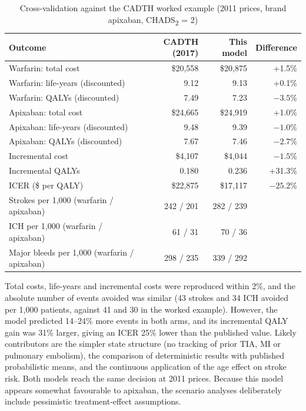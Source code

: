 \documentclass[11pt,letterpaper]{article}
\begin{document}
\begin{table}[H]
\centering
\caption{Cross-validation against the CADTH worked example (2011 prices, brand apixaban,
CHADS\textsubscript{2} = 2)}
\label{tab:validation}
\small
\begin{tabular}{@{}lrrr@{}}
\toprule
Outcome & CADTH (2017) & This model & Difference \\
\midrule
Warfarin: total cost & \$20,558 & \$20,875 & +1.5\% \\
Warfarin: life-years (discounted) & 9.12 & 9.13 & +0.1\% \\
Warfarin: QALYs (discounted) & 7.49 & 7.23 & $-3.5$\% \\
Apixaban: total cost & \$24,665 & \$24,919 & +1.0\% \\
Apixaban: life-years (discounted) & 9.48 & 9.39 & $-1.0$\% \\
Apixaban: QALYs (discounted) & 7.67 & 7.46 & $-2.7$\% \\
\midrule
Incremental cost & \$4,107 & \$4,044 & $-1.5$\% \\
Incremental QALYs & 0.180 & 0.236 & +31.3\% \\
ICER (\$ per QALY) & \$22,875 & \$17,117 & $-25.2$\% \\
\midrule
Strokes per 1,000 (warfarin / apixaban) & 242 / 201 & 282 / 239 & \\
ICH per 1,000 (warfarin / apixaban) & 61 / 31 & 70 / 36 & \\
Major bleeds per 1,000 (warfarin / apixaban) & 298 / 235 & 339 / 292 & \\
\bottomrule
\end{tabular}
\end{table}

Total costs, life-years and incremental costs were reproduced within 2\%, and the absolute number
of events avoided was similar (43 strokes and 34 ICH avoided per 1,000 patients, against 41 and 30
in the worked example). However, the model predicted 14--24\% more events in both arms, and its
incremental QALY gain was 31\% larger, giving an ICER 25\% lower than the published value. Likely
contributors are the simpler state structure (no tracking of prior TIA, MI or pulmonary embolism),
the comparison of deterministic results with published probabilistic means, and the continuous
application of the age effect on stroke risk. Both models reach the same decision at 2011 prices.
Because this model appears somewhat favourable to apixaban, the scenario analyses deliberately
include pessimistic treatment-effect assumptions.
\end{document}
